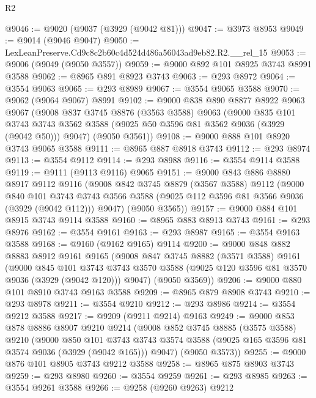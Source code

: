 \begin{lexlean}{R2}
\begin{coremodule}
@9046 := @9020 (@9037 (@3929 (@9042 @81)))
@9047 := @3973 @8953
@9049 := @9014 (@9046 @9047)
@9050 := LexLeanPreserve.Cd9c8c2b60c4d524d486a56043ad9eb82.R2.__rel_15
@9053 := @9006 (@9049 (@9050 @3557))
@9059 := @9000 @892 @101 @8925 @3743 @8991 @3588
@9062 := @8965 @891 @8923 @3743
@9063 := @293 @8972
@9064 := @3554 @9063
@9065 := @293 @8989
@9067 := @3554 @9065 @3588
@9070 := @9062 (@9064 @9067) @8991
@9102 := @9000
    @838
    @890
    @8877
    @8922
    @9063
    @9067
    (@9008
      @837
      @3745
      @8876
      (@3563 @3588)
      @9063
      (@9000
        @835
        @101
        @3743
        @3743
        @3562
        @3588
        (@9025 @50 @3596 @81 @3562 @9036 (@3929 (@9042 @50)))
        @9047)
      (@9050 @3561))
@9108 := @9000 @888 @101 @8920 @3743 @9065 @3588
@9111 := @8965 @887 @8918 @3743
@9112 := @293 @8974
@9113 := @3554 @9112
@9114 := @293 @8988
@9116 := @3554 @9114 @3588
@9119 := @9111 (@9113 @9116) @9065
@9151 := @9000
    @843
    @886
    @8880
    @8917
    @9112
    @9116
    (@9008
      @842
      @3745
      @8879
      (@3567 @3588)
      @9112
      (@9000
        @840
        @101
        @3743
        @3743
        @3566
        @3588
        (@9025 @112 @3596 @81 @3566 @9036 (@3929 (@9042 @112)))
        @9047)
      (@9050 @3565))
@9157 := @9000 @884 @101 @8915 @3743 @9114 @3588
@9160 := @8965 @883 @8913 @3743
@9161 := @293 @8976
@9162 := @3554 @9161
@9163 := @293 @8987
@9165 := @3554 @9163 @3588
@9168 := @9160 (@9162 @9165) @9114
@9200 := @9000
    @848
    @882
    @8883
    @8912
    @9161
    @9165
    (@9008
      @847
      @3745
      @8882
      (@3571 @3588)
      @9161
      (@9000
        @845
        @101
        @3743
        @3743
        @3570
        @3588
        (@9025 @120 @3596 @81 @3570 @9036 (@3929 (@9042 @120)))
        @9047)
      (@9050 @3569))
@9206 := @9000 @880 @101 @8910 @3743 @9163 @3588
@9209 := @8965 @879 @8908 @3743
@9210 := @293 @8978
@9211 := @3554 @9210
@9212 := @293 @8986
@9214 := @3554 @9212 @3588
@9217 := @9209 (@9211 @9214) @9163
@9249 := @9000
    @853
    @878
    @8886
    @8907
    @9210
    @9214
    (@9008
      @852
      @3745
      @8885
      (@3575 @3588)
      @9210
      (@9000
        @850
        @101
        @3743
        @3743
        @3574
        @3588
        (@9025 @165 @3596 @81 @3574 @9036 (@3929 (@9042 @165)))
        @9047)
      (@9050 @3573))
@9255 := @9000 @876 @101 @8905 @3743 @9212 @3588
@9258 := @8965 @875 @8903 @3743
@9259 := @293 @8980
@9260 := @3554 @9259
@9261 := @293 @8985
@9263 := @3554 @9261 @3588
@9266 := @9258 (@9260 @9263) @9212

\end{coremodule}
\end{lexlean}
